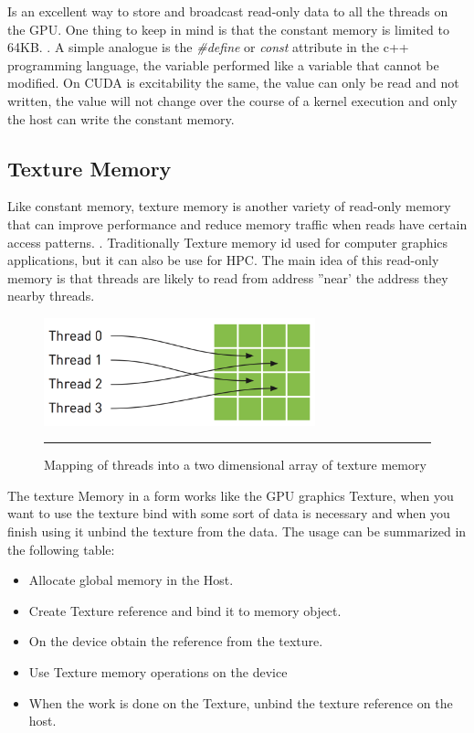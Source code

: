 Is an excellent way to store and broadcast read-only data to all the threads on the GPU. One thing to keep in mind is that the constant memory is limited to 64KB. \cite{design}. A simple analogue is the  \textit{\#define} or \textit{const} attribute in the c++ programming language, the variable performed like a variable that cannot be modified. On CUDA is  excitability the same, the value can only be read and not written, the value will not change over the course of a kernel execution and only the host can write the constant memory.\cite{example}

\subsection{Texture Memory}

Like constant memory, texture memory is another variety of read-only memory that can improve performance and reduce memory traffic when reads have certain access patterns. . Traditionally Texture memory id used for computer graphics applications, but it can also be use for HPC. The main idea of this read-only memory is that threads are likely to read from address ''near' the address they nearby threads.\cite{example}


\begin{figure}[htbp]
	\centering
		\includegraphics[width=0.7\textwidth]{Figures/texture.png}
		\rule{35em}{0.5pt}
	\caption[Texture Memory]{Mapping of threads into a two dimensional array of texture memory}
	\label{fig:texture}
\end{figure}

The texture Memory in a form works like the GPU graphics Texture, when you want to use the texture bind with some sort of data is necessary and when you finish using it unbind the texture from the data. The usage can be summarized in the following table:

\begin{itemize}
\item Allocate global memory in the Host.
\item Create Texture reference and bind it to memory object.
\item On the device obtain the reference from the texture.
\item  Use Texture memory operations on the device
\item  When the work is done on the Texture, unbind the texture reference on the host.
\end{itemize}


